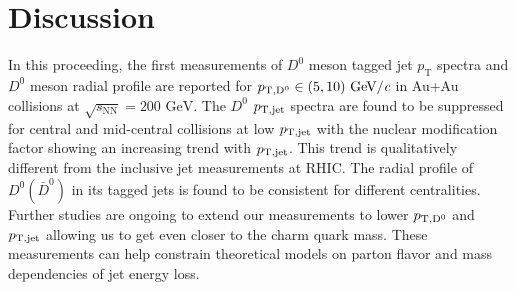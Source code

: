 \documentclass{appolb}
\begin{document}
\section{Discussion}
In this proceeding, the first measurements of $D^{0}$ meson tagged jet $p_{\text{T}}$ spectra and $D^{0}$ meson radial profile are reported for $p_{\rm T, D^{0}} \in (5, 10) \text{ GeV}/\textit{c}$ in Au+Au collisions at $\sqrt{s_{\text{NN}}} = 200 \text{ GeV}$. The $D^{0}$ $p_{\rm T, jet}$ spectra are found to be suppressed for central and mid-central collisions at low $p_{\rm T, jet}$ with the nuclear modification factor showing an increasing trend with $p_{\rm T, jet}$. This trend is qualitatively different from the inclusive jet measurements at RHIC. The radial profile of $D^{0} (\bar{D}^{0})$ in its tagged jets is found to be consistent for different centralities. Further studies are ongoing to extend our measurements to lower $p_{\rm T, D^{0}}$ and $p_{\rm T, jet}$ allowing us to get even closer to the charm quark mass. These measurements can help constrain theoretical models on parton flavor and mass dependencies of jet energy loss.

 



\end{document}
